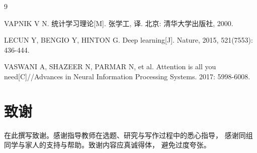 \documentclass[
  UTF8,
  fontset=fandol,        %
  zihao=-4,              %
  a4paper,
  oneside,               %
]{ctexbook}
\begin{document}
\begin{thebibliography}{9}
VAPNIK V N. 统计学习理论[M]. 张学工, 译. 北京: 清华大学出版社, 2000.

LECUN Y, BENGIO Y, HINTON G. Deep learning[J]. Nature, 2015,
521(7553): 436-444.

VASWANI A, SHAZEER N, PARMAR N, et al. Attention is all you
need[C]//Advances in Neural Information Processing Systems. 2017: 5998-6008.
\end{thebibliography}

\chapter*{致\quad 谢}
在此撰写致谢。感谢指导教师在选题、研究与写作过程中的悉心指导，
感谢同组同学与家人的支持与帮助。致谢内容应真诚得体，
避免过度夸张。
\end{document}
